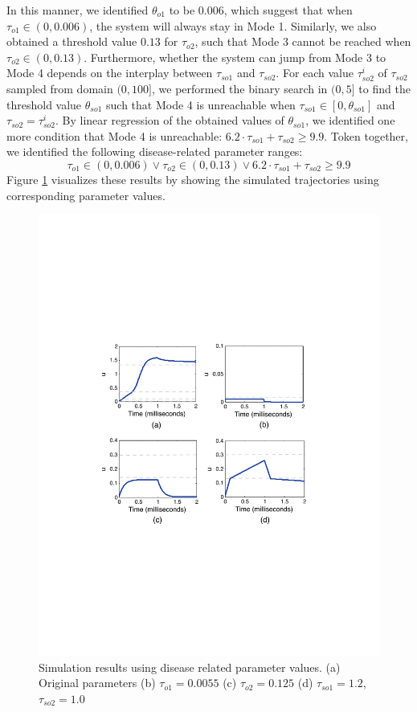 In this manner, we identified $\theta_{o1}$ to be $0.006$, which suggest that when $\tau_{o1} \in (0, 0.006)$, the system will always stay in Mode 1. Similarly, we also obtained a threshold value $0.13$ for $\tau_{o2}$, such that Mode 3 cannot be reached when $\tau_{o2} \in (0, 0.13)$. Furthermore, whether the system can jump from Mode 3 to Mode 4 depends on the interplay between $\tau_{so1}$ and $\tau_{so2}$.  For each value $\tau_{so2}^i$ of $\tau_{so2}$ sampled from domain $(0, 100]$, we performed the binary search in $(0, 5]$ to find the threshold value $\theta_{so1}$ such that Mode 4 is unreachable when $\tau_{so1} \in [0,\theta_{so1}]$ and $\tau_{so2} = {\tau_{so2}^i}$. By linear regression of the obtained values of $\theta_{so1}$, we identified one more condition that Mode 4 is unreachable:  $6.2 \cdot \tau_{so1} + \tau_{so2} \ge 9.9$. Token together, we identified the following disease-related parameter ranges:  
$$\tau_{o1} \in (0,0.006)\vee \tau_{o2} \in (0,0.13)\vee 6.2 \cdot \tau_{so1} + \tau_{so2} \ge 9.9$$
Figure \ref{cresults} visualizes these results by showing the simulated trajectories using corresponding  parameter values.


\begin{figure}[h]
\centering
\includegraphics[scale=0.6]{fig-cardiactraj2}
\caption{Simulation results using disease related parameter values. (a) Original parameters (b) $\tau_{o1}=0.0055$ (c) $\tau_{o2} = 0.125$ (d) $\tau_{so1} =1.2$, $\tau_{so2} =1.0$ }
\label{cresults}
\end{figure}

